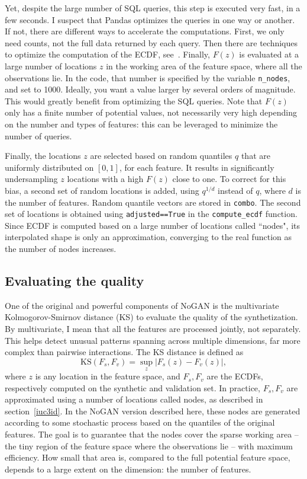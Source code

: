\documentclass[oneside,10pt]{book}
\begin{document}
Yet, despite the large number of SQL queries, this step is executed very fast, in a few seconds. I suspect that Pandas optimizes the queries
 in one way or another. If not, there are different ways to accelerate the computations. First, we only need counts, not the full data returned by each query. Then there are techniques to optimize the computation of the ECDF, see~\cite{putrider22}. Finally, $F(z)$ is evaluated
 at a large number of locations $z$ in the working area of the feature space, where all the observations lie. In the code, that number is specified by the variable \texttt{n\_nodes}, and set to 1000. Ideally, you want a value larger by several orders of magnitude. This would greatly benefit from optimizing the SQL queries. Note that $F(z)$ only has a finite number of potential values, not necessarily very high depending on the number and types of features: this can be leveraged to minimize the number of queries.

 Finally, the locations $z$ are selected based on random quantiles $q$ that are uniformly distributed on $[0, 1]$, for each feature.  It results in
significantly undersampling $z$ locations with a high $F(z)$ close to one. To correct for this bias, a second set of random locations is added, using
  $q^{1/d}$ instead of $q$, where $d$ is the number of features. Random quantile vectors are stored in \texttt{combo}. The second set
 of locations is obtained using \texttt{adjusted==True} in the \texttt{compute\_ecdf} function. Since ECDF is computed based on a large number
 of locations called ``nodes", its interpolated shape is only an approximation, converging to the real function as the number of nodes increases.

\subsection{Evaluating the quality}\label{evrd7hg}

One of the original and powerful components of NoGAN is the multivariate
\textcolor{index}{Kolmogorov-Smirnov distance} (KS) to evaluate the quality of
 the synthetization. By multivariate, I mean that all the features are processed jointly, not separately. This helps detect unusual patterns spanning across multiple dimensions, far more complex than pairwise interactions. The KS distance is defined as
$$
\text{KS}(F_s, F_v) = \sup_{z} |F_s(z) - F_v(z)|,
$$
where $z$ is any location in the feature space, and $F_s, F_v$ are the ECDFs, respectively computed on the synthetic and validation set.
In practice, $F_s,F_v$ are approximated using a number of locations called nodes, as described in section~\ref{iuc3id}. In the NoGAN version
 described here, these nodes are generated according to some stochastic process based on the quantiles of the original features. The goal is to guarantee
 that the nodes cover the sparse working area -- the tiny region of the feature space where the observations lie  -- with maximum efficiency.
 How small that area is, compared to the full potential feature space, depends to a large extent on the dimension: the number of features.
\end{document}
